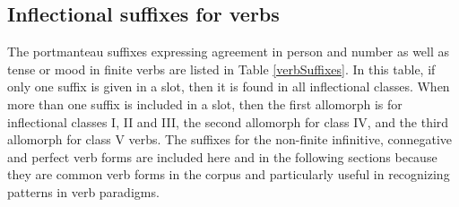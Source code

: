 \subsection{Inflectional suffixes for verbs}\label{inflectionalSuffVerbs}
The portmanteau suffixes expressing agreement in person and number as well as tense or mood in finite verbs are listed in Table \vref{verbSuffixes}. 
In this table, if only one suffix is given in a slot, then it is found in all inflectional classes. When more than one suffix is included in a slot, then the first allomorph is for inflectional classes I, II and III, the second allomorph for class IV, and the third allomorph for class V verbs. 
The suffixes for the non-finite infinitive, connegative and perfect verb forms are included here and in the following sections because they are common verb forms in the corpus and particularly useful in recognizing patterns in verb paradigms. %
